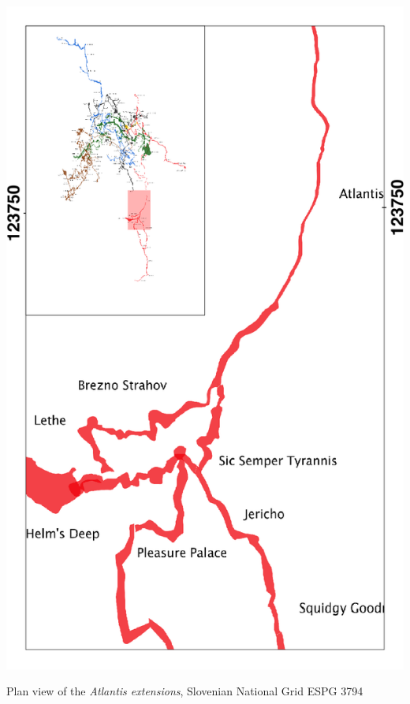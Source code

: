 \begin{marginfigure}
\checkoddpage \ifoddpage \forcerectofloat \else \forceversofloat \fi
\centering
 \includegraphics[width=\linewidth]{images/2014/tanguy-2014/Atlantis_inset}
 \caption{Plan view of the \emph{Atlantis extensions}, Slovenian National Grid ESPG 3794}
 \label{Atlantis inset}
\end{marginfigure}

